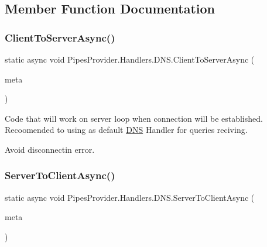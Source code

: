 \subsection{Member Function Documentation}
\mbox{\label{class_pipes_provider_1_1_handlers_1_1_d_n_s_a367bb1e465456ed8d76a85157ce80cb6}} 
\subsubsection{\texorpdfstring{Client\+To\+Server\+Async()}{ClientToServerAsync()}}
{\footnotesize\ttfamily static async void Pipes\+Provider.\+Handlers.\+D\+N\+S.\+Client\+To\+Server\+Async (\begin{DoxyParamCaption}\item[{\mbox{\hyperlink{class_pipes_provider_1_1_server_1_1_server_transmission_controller}{Server\+Transmission\+Controller}}}]{meta }\end{DoxyParamCaption})\hspace{0.3cm}{\ttfamily [static]}}



Code that will work on server loop when connection will be established. Recoomended to using as default \mbox{\hyperlink{class_pipes_provider_1_1_handlers_1_1_d_n_s}{D\+NS}} Handler for queries reciving. 

Avoid disconnectin error. \mbox{\label{class_pipes_provider_1_1_handlers_1_1_d_n_s_af67546f286d7bbd49cdf2cf36836298a}} 
\subsubsection{\texorpdfstring{Server\+To\+Client\+Async()}{ServerToClientAsync()}}
{\footnotesize\ttfamily static async void Pipes\+Provider.\+Handlers.\+D\+N\+S.\+Server\+To\+Client\+Async (\begin{DoxyParamCaption}\item[{\mbox{\hyperlink{class_pipes_provider_1_1_server_1_1_server_transmission_controller}{Server\+Transmission\+Controller}}}]{meta }\end{DoxyParamCaption})\hspace{0.3cm}{\ttfamily [static]}}



